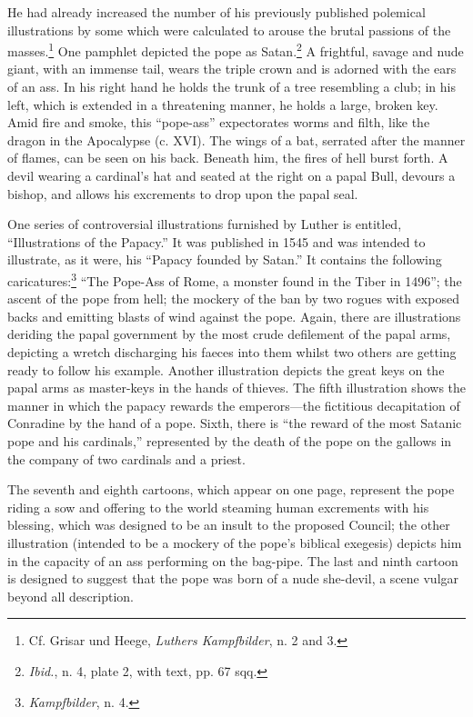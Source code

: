 He had already increased the number of his previously published
polemical illustrations by some which were calculated to arouse the
brutal passions of the masses.\footnote{Cf. Grisar und Heege, \textit{Luthers Kampfbilder}, n. 2 and 3.}
One pamphlet depicted the pope as
Satan.\footnote{\textit{Ibid.}, n. 4, plate 2, with text, pp. 67 sqq.}
A frightful, savage and nude giant, with an immense tail,
wears the triple crown and is adorned with the ears of an ass. In his
right hand he holds the trunk of a tree resembling a club; in his left,
which is extended in a threatening manner, he holds a large, broken
key. Amid fire and smoke, this ``pope-ass'' expectorates worms and
filth, like the dragon in the Apocalypse (c. XVI). The wings of a bat,
serrated after the manner of flames, can be seen on his back. Beneath
him, the fires of hell burst forth. A devil wearing a cardinal’s hat
and seated at the right on a papal Bull, devours a bishop, and allows
his excrements to drop upon the papal seal.

One series of controversial illustrations furnished by Luther is entitled,
“Illustrations of the Papacy.” It was published in 1545 and
was intended to illustrate, as it were, his “Papacy founded by Satan.”
It contains the following caricatures:\footnote{\textit{Kampfbilder}, n. 4.}
“The Pope-Ass of Rome, a
monster found in the Tiber in 1496”; the ascent of the pope from
hell; the mockery of the ban by two rogues with exposed backs and
emitting blasts of wind against the pope. Again, there are illustrations
deriding the papal government by the most crude defilement of
the papal arms, depicting a wretch discharging his faeces into them
whilst two others are getting ready to follow his example. Another
illustration depicts the great keys on the papal arms as master-keys in
the hands of thieves. The fifth illustration shows the manner in which
the papacy rewards the emperors—the fictitious decapitation of Conradine
by the hand of a pope. Sixth, there is “the reward of the most
Satanic pope and his cardinals,” represented by the death of the
pope on the gallows in the company of two cardinals and a priest.

The seventh and eighth cartoons, which appear on one page, represent
the pope riding a sow and offering to the world steaming human excrements
with his blessing, which was designed to be an insult to the
proposed Council; the other illustration (intended to be a mockery
of the pope’s biblical exegesis) depicts him in the capacity of an ass
performing on the bag-pipe. The last and ninth cartoon is designed to
suggest that the pope was born of a nude she-devil, a scene vulgar
beyond all description.


